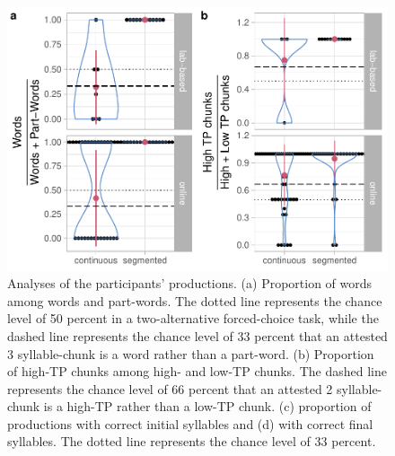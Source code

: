 \documentclass[
]{article}
\begin{document}
\begin{figure}

{\centering \includegraphics[width=0.8\linewidth]{segmentation_recall_combined_for_revision2_files/figure-latex/recall-w-pw-chunks-positions-plot-wpw-chunks-1} 

}

\caption{Analyses of the participants' productions. (a) Proportion of words among words and part-words. The dotted line represents the chance level of 50 percent in a two-alternative forced-choice task, while the dashed line represents the chance level of 33 percent that an attested 3 syllable-chunk is a word rather than a part-word. (b) Proportion of high-TP chunks among high- and low-TP chunks. The dashed line represents the chance level of 66 percent that an attested 2 syllable-chunk is a high-TP rather than a low-TP chunk. (c) proportion of productions with correct initial syllables and (d) with correct final syllables. The dotted line represents the chance level of 33 percent.}\label{fig:recall-w-pw-chunks-positions-plot-wpw-chunks}
\end{figure}
\end{document}
